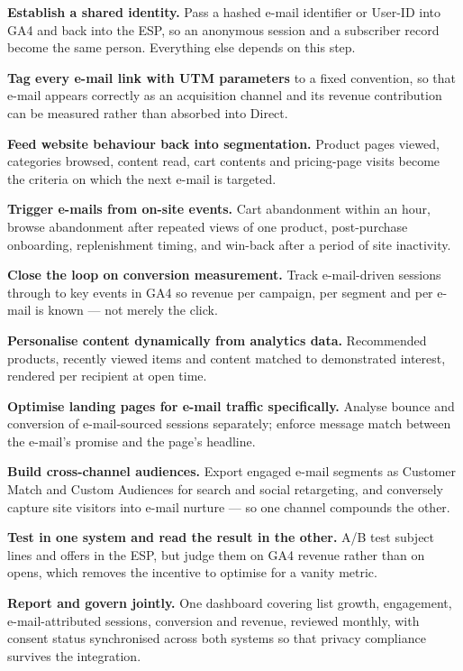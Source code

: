\begin{qlist}
\begin{apts}
\item \textbf{Establish a shared identity.} Pass a hashed e-mail identifier or
      User-ID into GA4 and back into the ESP, so an anonymous session and a
      subscriber record become the same person. Everything else depends on this
      step.
\item \textbf{Tag every e-mail link with UTM parameters} to a fixed convention,
      so that e-mail appears correctly as an acquisition channel and its
      revenue contribution can be measured rather than absorbed into Direct.
\item \textbf{Feed website behaviour back into segmentation.} Product pages
      viewed, categories browsed, content read, cart contents and pricing-page
      visits become the criteria on which the next e-mail is targeted.
\item \textbf{Trigger e-mails from on-site events.} Cart abandonment within an
      hour, browse abandonment after repeated views of one product,
      post-purchase onboarding, replenishment timing, and win-back after a
      period of site inactivity.
\item \textbf{Close the loop on conversion measurement.} Track e-mail-driven
      sessions through to key events in GA4 so revenue per campaign, per
      segment and per e-mail is known --- not merely the click.
\item \textbf{Personalise content dynamically from analytics data.} Recommended
      products, recently viewed items and content matched to demonstrated
      interest, rendered per recipient at open time.
\item \textbf{Optimise landing pages for e-mail traffic specifically.} Analyse
      bounce and conversion of e-mail-sourced sessions separately; enforce
      message match between the e-mail's promise and the page's headline.
\item \textbf{Build cross-channel audiences.} Export engaged e-mail segments as
      Customer Match and Custom Audiences for search and social retargeting, and
      conversely capture site visitors into e-mail nurture --- so one channel
      compounds the other.
\item \textbf{Test in one system and read the result in the other.} A/B test
      subject lines and offers in the ESP, but judge them on GA4 revenue rather
      than on opens, which removes the incentive to optimise for a vanity
      metric.
\item \textbf{Report and govern jointly.} One dashboard covering list growth,
      engagement, e-mail-attributed sessions, conversion and revenue, reviewed
      monthly, with consent status synchronised across both systems so that
      privacy compliance survives the integration.
\end{apts}


\end{qlist}
